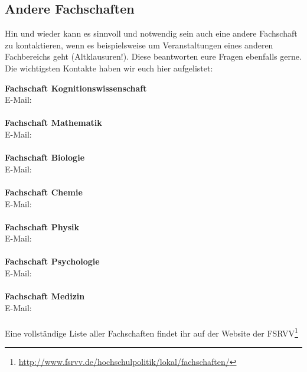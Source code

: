 \vfill
\subsection{Andere Fachschaften}
Hin und wieder kann es sinnvoll und notwendig sein auch eine andere Fachschaft zu kontaktieren, wenn es beispielsweise um Veranstaltungen eines anderen Fachbereichs geht (Altklausuren!). Diese beantworten eure Fragen ebenfalls gerne. Die wichtigsten Kontakte haben wir euch hier aufgelistet:

\textbf{Fachschaft Kognitionswissenschaft}\\
E-Mail: \\
\\
\textbf{Fachschaft Mathematik}\\
E-Mail: \\
\\
\textbf{Fachschaft Biologie}\\
E-Mail: \\
\\
\textbf{Fachschaft Chemie}\\
E-Mail: \\
\\
\textbf{Fachschaft Physik}\\
E-Mail: \\
\\
\textbf{Fachschaft Psychologie}\\
E-Mail: \\
\\
\textbf{Fachschaft Medizin}\\
E-Mail: \\
\\
Eine vollständige Liste aller Fachschaften findet ihr auf der Website der FSRVV\footnote{\url{http://www.fsrvv.de/hochschulpolitik/lokal/fachschaften/}}	%

\vfill

